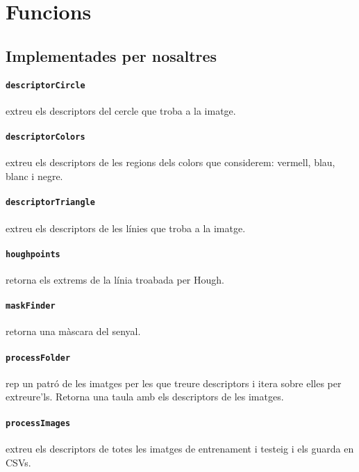 
\section{Funcions}

\subsection{Implementades per nosaltres}

\paragraph{\texttt{descriptorCircle}} extreu els descriptors del cercle que troba
a la imatge.

\paragraph{\texttt{descriptorColors}} extreu els descriptors de les regions dels
colors que considerem: vermell, blau, blanc i negre.

\paragraph{\texttt{descriptorTriangle}} extreu els descriptors de les línies que troba
a la imatge.

\paragraph{\texttt{houghpoints}} retorna els extrems de la línia troabada per Hough.

\paragraph{\texttt{maskFinder}} retorna una màscara del senyal.

\paragraph{\texttt{processFolder}} rep un patró de les imatges per les que treure 
descriptors i itera sobre elles per extreure'ls. Retorna una taula amb els descriptors
de les imatges.

\paragraph{\texttt{processImages}} extreu els descriptors de totes les imatges de
entrenament i testeig i els guarda en CSVs.

